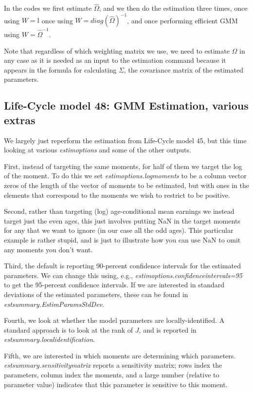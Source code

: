 In the codes we first estimate $\hat{\Omega}$, and we then do the estimation three times, once using $W=\mathbb{I}$ once using $W=diag(\hat{\Omega})^{-1}$, and once performing efficient GMM using $W=\hat{\Omega}^{-1}$.

Note that regardless of which weighting matrix we use, we need to estimate $\Omega$ in any case as it is needed as an input to the estimation command because it appears in the formula for calculating $\Sigma$, the covariance matrix of the estimated parameters.

\subsection{Life-Cycle model 48: GMM Estimation, various extras}
We largely just reperform the estimation from Life-Cycle model 45, but this time looking at various \textit{estimoptions} and some of the other outputs.

First, instead of targeting the same moments, for half of them we target the log of the moment. To do this we set \textit{estimoptions.logmoments} to be a column vector zeros of the length of the vector of moments to be estimated, but with ones in the elements that correspond to the moments we wish to restrict to be positive.

Second, rather than targeting (log) age-conditional mean earnings we instead target just the even ages, this just involves putting NaN in the target moments for any that we want to ignore (in our case all the odd ages). This particular example is rather stupid, and is just to illustrate how you can use NaN to omit any moments you don't want.

Third, the default is reporting 90-percent confidence intervals for the estimated parameters. We can change this using, e.g., \textit{estimoptions.confidenceintervals=95} to get the 95-percent confidence intervals. If we are interested in standard deviations of the estimated parameters, these can be found in \textit{estsummary.EstimParamsStdDev}.

Fourth, we look at whether the model parameters are locally-identified. A standard approach is to look at the rank of $J$, and is reported in \textit{estsummary.localidentification}.

Fifth, we are interested in which moments are determining which parameters. \textit{estsummary.sensitivitymatrix} reports a sensitivity matrix; rows index the parameters, column index the moments, and a large number (relative to parameter value) indicates that this parameter is sensitive to this moment.

